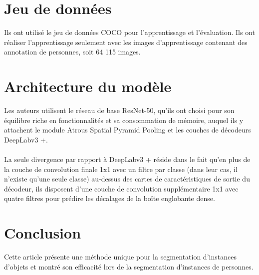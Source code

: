 \documentclass[11pt]{report}
\begin{document}
\section{Jeu de données}
Ils ont utilisé le jeu de données COCO pour l'apprentissage et l'évaluation. Ils ont réaliser l'apprentissage seulement avec les images d'apprentissage contenant des annotation de personnes, soit 64 115 images.

\section{Architecture du modèle}
Les auteurs utilisent le réseau de base ResNet-50, qu'ils ont choisi pour son équilibre riche en fonctionnalités et sa consommation de mémoire, auquel ils y attachent le module Atrous Spatial Pyramid Pooling et les couches de décodeurs DeepLabv3 +.\\\\
La seule divergence par rapport à DeepLabv3 + réside dans le fait qu’en plus de la couche de convolution finale 1x1 avec un filtre par classe (dans leur cas, il n'existe qu'une seule classe) au-dessus des cartes de caractéristiques de sortie du décodeur, ils disposent d'une couche de convolution supplémentaire 1x1 avec quatre filtres pour prédire les décalages de la boîte englobante dense.


\section{Conclusion}
Cette article présente une méthode unique pour la segmentation d'instances d'objets et montré son efficacité lors de la segmentation d'instances de personnes.
\end{document}
